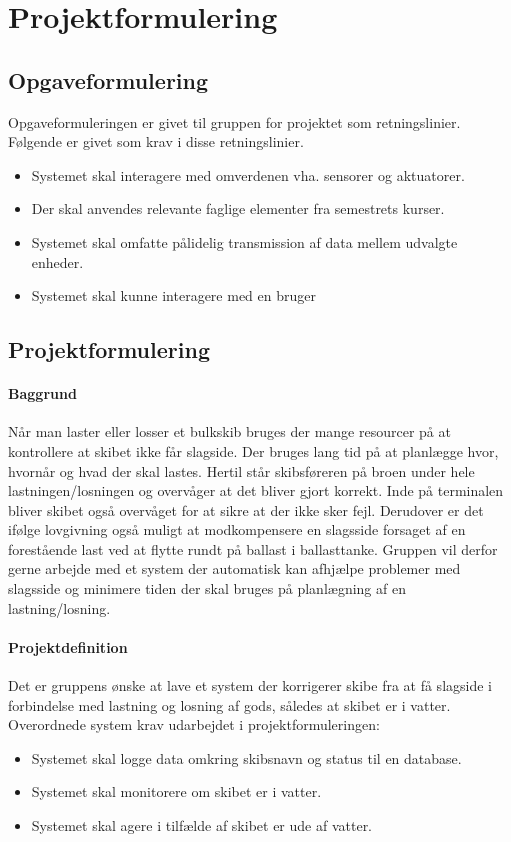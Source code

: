 \chapter{Projektformulering}
\section{Opgaveformulering}
\label{ch:Opgaveformulering}
Opgaveformuleringen er givet til gruppen for projektet som retningslinier. Følgende er givet som krav i disse retningslinier.
\begin{itemize}
\item Systemet skal interagere med omverdenen vha. sensorer og aktuatorer.
\item Der skal anvendes relevante faglige elementer fra semestrets kurser.
\item Systemet skal omfatte pålidelig transmission af data mellem udvalgte enheder.
\item Systemet skal kunne interagere med en bruger
\end{itemize}
\section{Projektformulering}
\label{ch:Projektformulering}
\subsubsection{Baggrund}
Når man laster eller losser et bulkskib bruges der mange resourcer på at kontrollere at skibet ikke får slagside. Der bruges lang tid på at planlægge hvor, hvornår og hvad der skal lastes. Hertil står skibsføreren på broen under hele lastningen/losningen og overvåger at det bliver gjort korrekt. Inde på terminalen bliver skibet også overvåget for at sikre at der ikke sker fejl. Derudover er det ifølge lovgivning også muligt at modkompensere en slagsside forsaget af en forestående last ved at flytte rundt på ballast i ballasttanke. Gruppen vil derfor gerne arbejde med et system der automatisk kan afhjælpe problemer med slagsside og minimere tiden der skal bruges på planlægning af en lastning/losning.

\subsubsection{Projektdefinition}
Det er gruppens ønske at lave et system der korrigerer skibe fra at få slagside i forbindelse med lastning og losning af gods, således at skibet er i vatter. Overordnede system krav udarbejdet i projektformuleringen:
\begin{itemize}
\item Systemet skal logge data omkring skibsnavn og status til en database.
\item Systemet skal monitorere om skibet er i vatter.
\item Systemet skal agere i tilfælde af skibet er ude af vatter.
\end{itemize}
